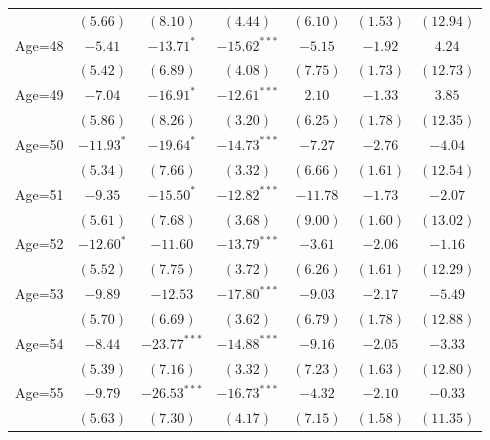\documentclass[fullpage]{paper}
\begin{document}
\begin{center}
\begin{longtable}{l c c c c c c }
            & $(5.66)$      & $(8.10)$       & $(4.44)$       & $(6.10)$      & $(1.53)$      & $(12.94)$     \\
Age=48      & $-5.41$       & $-13.71^{*}$   & $-15.62^{***}$ & $-5.15$       & $-1.92$       & $4.24$        \\
            & $(5.42)$      & $(6.89)$       & $(4.08)$       & $(7.75)$      & $(1.73)$      & $(12.73)$     \\
Age=49      & $-7.04$       & $-16.91^{*}$   & $-12.61^{***}$ & $2.10$        & $-1.33$       & $3.85$        \\
            & $(5.86)$      & $(8.26)$       & $(3.20)$       & $(6.25)$      & $(1.78)$      & $(12.35)$     \\
Age=50      & $-11.93^{*}$  & $-19.64^{*}$   & $-14.73^{***}$ & $-7.27$       & $-2.76$       & $-4.04$       \\
            & $(5.34)$      & $(7.66)$       & $(3.32)$       & $(6.66)$      & $(1.61)$      & $(12.54)$     \\
Age=51      & $-9.35$       & $-15.50^{*}$   & $-12.82^{***}$ & $-11.78$      & $-1.73$       & $-2.07$       \\
            & $(5.61)$      & $(7.68)$       & $(3.68)$       & $(9.00)$      & $(1.60)$      & $(13.02)$     \\
Age=52      & $-12.60^{*}$  & $-11.60$       & $-13.79^{***}$ & $-3.61$       & $-2.06$       & $-1.16$       \\
            & $(5.52)$      & $(7.75)$       & $(3.72)$       & $(6.26)$      & $(1.61)$      & $(12.29)$     \\
Age=53      & $-9.89$       & $-12.53$       & $-17.80^{***}$ & $-9.03$       & $-2.17$       & $-5.49$       \\
            & $(5.70)$      & $(6.69)$       & $(3.62)$       & $(6.79)$      & $(1.78)$      & $(12.88)$     \\
Age=54      & $-8.44$       & $-23.77^{***}$ & $-14.88^{***}$ & $-9.16$       & $-2.05$       & $-3.33$       \\
            & $(5.39)$      & $(7.16)$       & $(3.32)$       & $(7.23)$      & $(1.63)$      & $(12.80)$     \\
Age=55      & $-9.79$       & $-26.53^{***}$ & $-16.73^{***}$ & $-4.32$       & $-2.10$       & $-0.33$       \\
            & $(5.63)$      & $(7.30)$       & $(4.17)$       & $(7.15)$      & $(1.58)$      & $(11.35)$     \\

\end{longtable}
\end{center}
\end{document}
